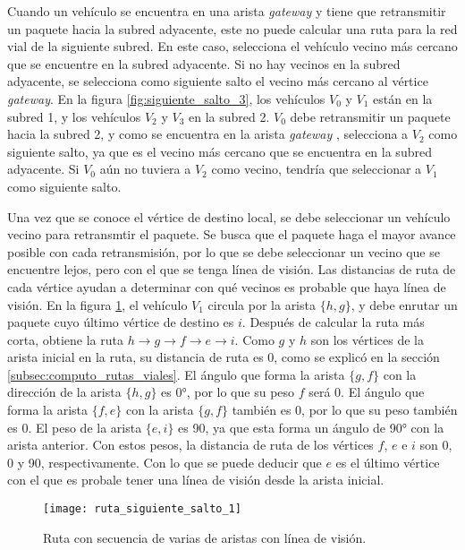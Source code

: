 Cuando un vehículo se encuentra en una arista \textit{gateway} y tiene que
retransmitir un paquete hacia la subred adyacente, este no puede calcular una
ruta para la red vial de la siguiente subred. En este caso, selecciona el
vehículo vecino más cercano que se encuentre en la subred adyacente. Si no hay
vecinos en la subred adyacente, se selecciona como siguiente salto el vecino más
cercano al vértice \textit{gateway}. En la figura \ref{fig:siguiente_salto_3},
los vehículos $V_0$ y $V_1$ están en la subred 1, y los vehículos $V_2$ y $V_3$
en la subred 2. $V_0$ debe retransmitir un paquete hacia la subred 2, y como se
encuentra en la arista \textit{gateway} {}, selecciona a $V_2$ como siguiente
salto, ya que es el vecino más cercano que se encuentra en la subred adyacente.
Si $V_0$ aún no tuviera a $V_2$ como vecino, tendría que seleccionar a $V_1$
como siguiente salto.


Una vez que se conoce el vértice de destino local, se debe seleccionar un
vehículo vecino para retransmtir el paquete. Se busca que el paquete haga el
mayor avance posible con cada retransmisión, por lo que se debe seleccionar un
vecino que se encuentre lejos, pero con el que se tenga línea de visión. Las
distancias de ruta de cada vértice ayudan a determinar con qué vecinos es
probable que haya línea de visión. En la figura
\ref{fig:ruta_siguiente_salto_1}, el vehículo $V_1$ circula por la arista
$\{h,g\}$, y debe enrutar un paquete cuyo último vértice de destino es $i$.
Después de calcular la ruta más corta, obtiene la ruta $h \rightarrow g
\rightarrow f \rightarrow e \rightarrow i$. Como $g$ y $h$ son los vértices de
la arista inicial en la ruta, su distancia de ruta es 0, como se explicó en la
sección \ref{subsec:computo_rutas_viales}. El ángulo que forma la arista
$\{g,f\}$ con la dirección de la arista $\{h,g\}$ es 0\si{\degree}, por lo que
su peso $f$ será 0. El ángulo que forma la arista $\{f,e\}$ con la arista
$\{g,f\}$ también es 0, por lo que su peso también es 0. El peso de la arista
$\{e,i\}$ es 90, ya que esta forma un ángulo de 90\si{\degree} con la arista
anterior. Con estos pesos, la distancia de ruta de los vértices $f$, $e$ e $i$
son 0, 0 y 90, respectivamente. Con lo que se puede deducir que $e$ es el
último vértice con el que es probale tener una línea de visión desde la arista
inicial.

\begin{figure}[th!]
\centering
\texttt{[image: ruta\_siguiente\_salto\_1]}
\decoRule
\caption[Ruta con secuencia de varias aristas con línea de visión]{Ruta con
secuencia de varias de aristas con línea de visión.}
\label{fig:ruta_siguiente_salto_1}
\end{figure}

